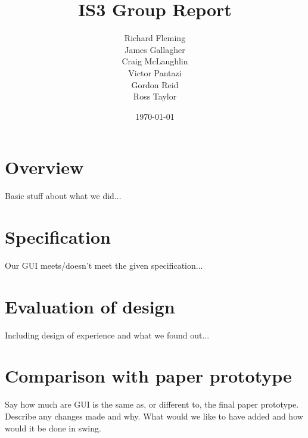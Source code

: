 \documentclass{article}
\title{IS3 Group Report}
\author{
  Richard Fleming \\
  James Gallagher \\
  Craig McLaughlin \\
  Victor Pantazi \\
  Gordon Reid \\
  Ross Taylor}
\date{\today}
\begin{document}

\maketitle


\section{Overview}

Basic stuff about what we did...

\section{Specification}

Our GUI meets/doesn't meet the given specification...

\section{Evaluation of design}

Including design of experience and what we found out...

\section{Comparison with paper prototype}

Say how much are GUI is the same as, or different to, the final paper
prototype. Describe any changes made and why. What would we like to have
added and how would it be done in swing.
\end{document}
